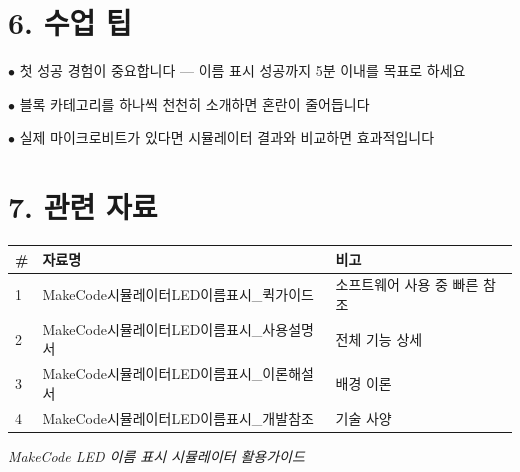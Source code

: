 \documentclass[11pt,a4paper]{article}
\begin{document}
\section*{6. 수업 팁}

$\bullet$  첫 성공 경험이 중요합니다 — 이름 표시 성공까지 5분 이내를 목표로 하세요

$\bullet$  블록 카테고리를 하나씩 천천히 소개하면 혼란이 줄어듭니다

$\bullet$  실제 마이크로비트가 있다면 시뮬레이터 결과와 비교하면 효과적입니다



\section*{7. 관련 자료}

\begin{center}
\renewcommand{\arraystretch}{1.4}
\begin{tabular}{|p{1.5cm}|p{7.6cm}|p{5.9cm}|}
\hline
\rowcolor{tableheader}
\textbf{\#} & \textbf{자료명} & \textbf{비고} \\
\hline
1 & MakeCode시뮬레이터LED이름표시\_퀵가이드 & 소프트웨어 사용 중 빠른 참조 \\
\hline
2 & MakeCode시뮬레이터LED이름표시\_사용설명서 & 전체 기능 상세 \\
\hline
3 & MakeCode시뮬레이터LED이름표시\_이론해설서 & 배경 이론 \\
\hline
4 & MakeCode시뮬레이터LED이름표시\_개발참조 & 기술 사양 \\
\hline
\end{tabular}
\end{center}


\vfill
\begin{center}
\small\color{lightbrown}
\textit{MakeCode LED 이름 표시 시뮬레이터 활용가이드}
\end{center}
\end{document}
